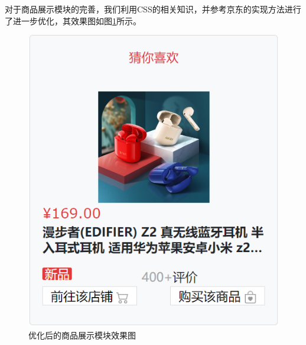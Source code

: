 \documentclass[a4paper,12pt]{article}
\begin{document}
    对于商品展示模块的完善，我们利用CSS的相关知识，并参考京东的实现方法进行了进一步优化，其效果图如图\ref{fig:2}所示。

    \begin{figure}[H]
        \centering
        \includegraphics[scale=0.7]{pic/pic2.png}
        \caption{优化后的商品展示模块效果图}
        \label{fig:2}
    \end{figure}
\end{document}
